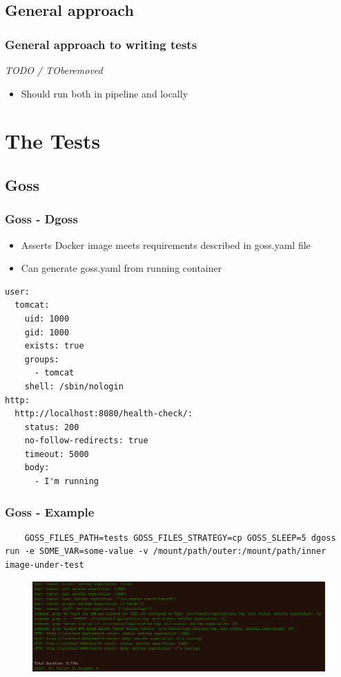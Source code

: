 \documentclass[14pt,aspectratio=169]{beamer}
\begin{document}
\subsection{General approach}

\begin{frame}
  \frametitle{General approach to writing tests}
  \textit{TODO / TOberemoved}
  \begin{itemize}
    \item Should run both in pipeline and locally
  \end{itemize}
\end{frame}

\section{The Tests}

\subsection{Goss}

\begin{frame}[fragile]
  \frametitle{Goss - Dgoss}
  \begin{itemize}
    \item Asserts Docker image meets requirements described in goss.yaml file
    \item Can generate goss.yaml from running container
  \end{itemize}

  \begin{verbatim}
user:
  tomcat:
    uid: 1000
    gid: 1000
    exists: true
    groups:
      - tomcat
    shell: /sbin/nologin
http:
  http://localhost:8080/health-check/:
    status: 200
    no-follow-redirects: true
    timeout: 5000
    body:
      - I'm running
  \end{verbatim}
\end{frame}

\begin{frame}[fragile]
  \frametitle{Goss - Example}
  \begin{verbatim}
    GOSS_FILES_PATH=tests GOSS_FILES_STRATEGY=cp GOSS_SLEEP=5 dgoss run -e SOME_VAR=some-value -v /mount/path/outer:/mount/path/inner image-under-test
  \end{verbatim}
  \begin{figure}
    \includegraphics[width=\textwidth]{images/goss.png}
  \end{figure}
\end{frame}
\end{document}

